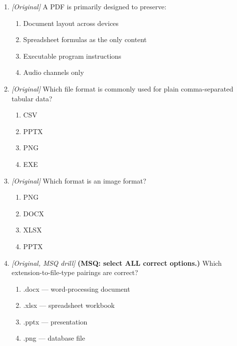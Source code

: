 \begin{enumerate}[label=\textbf{Q\arabic*.}, leftmargin=*]
\item \textit{[Original]} A PDF is primarily designed to preserve:
  \begin{enumerate}[label=\Alph*.]
\item Document layout across devices
   \item Spreadsheet formulas as the only content
   \item Executable program instructions
   \item Audio channels only
  \end{enumerate}

\item \textit{[Original]} Which file format is commonly used for plain comma-separated tabular data?
  \begin{enumerate}[label=\Alph*.]
\item CSV
   \item PPTX
   \item PNG
   \item EXE
  \end{enumerate}

\item \textit{[Original]} Which format is an image format?
  \begin{enumerate}[label=\Alph*.]
\item PNG
   \item DOCX
   \item XLSX
   \item PPTX
  \end{enumerate}

\item \textit{[Original, MSQ drill]} \textbf{(MSQ: select ALL correct options.)} Which extension-to-file-type pairings are correct?
  \begin{enumerate}[label=\Alph*.]
\item .docx --- word-processing document
   \item .xlsx --- spreadsheet workbook
   \item .pptx --- presentation
   \item .png --- database file
  \end{enumerate}

\end{enumerate}
